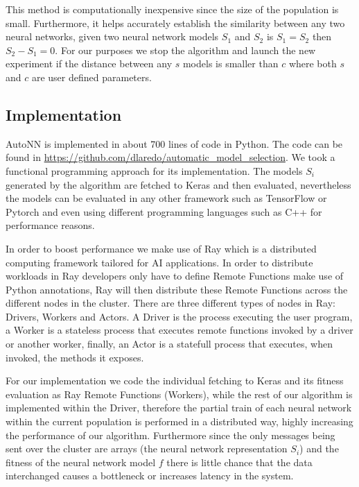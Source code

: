 \documentclass[journal]{IEEEtran}
\begin{document}
This method is computationally inexpensive since the size of the population is small. Furthermore, it helps accurately establish the similarity between any two neural networks, given two neural network models $S_1$ and $S_2$ is $S_1 = S_2$ then $S_2 - S_1 = 0$. For our purposes we stop the algorithm and launch the new experiment if the distance between any $s$ models is smaller than $c$ where both $s$ and $c$ are user defined parameters.

\subsection{Implementation}
\label{sec:implementation}

AutoNN is implemented in about 700 lines of code in Python. The code can be found in \url{https://github.com/dlaredo/automatic_model_selection}. We took a functional programming approach for its implementation. The models $S_i$ generated by the algorithm are fetched to Keras \cite{keras2015} and then evaluated, nevertheless the models can be evaluated in any other framework such as TensorFlow or Pytorch and even using different programming languages such as C++ for performance reasons.

In order to boost performance we make use of Ray \cite{Moritz2017} which is a distributed computing framework tailored for AI applications. In order to distribute workloads in Ray developers only have to define Remote Functions make use of Python annotations, Ray will then distribute these Remote Functions across the different nodes in the cluster. There are three different types of nodes in Ray: Drivers, Workers and Actors. A Driver is the process executing the user program, a Worker is a stateless process that executes remote functions invoked by a driver or another worker, finally, an Actor is a statefull process that executes, when invoked, the methods it exposes.

For our implementation we code the individual fetching to Keras and its fitness evaluation as Ray Remote Functions (Workers), while the rest of our algorithm is implemented within the Driver, therefore the partial train of each neural network within the current population is performed in a distributed way, highly increasing the performance of our algorithm. Furthermore since the only messages being sent over the cluster are arrays (the neural network representation $S_i$) and the fitness of the neural network model $f$ there is little chance that the data interchanged causes a bottleneck or increases latency in the system.
\end{document}
